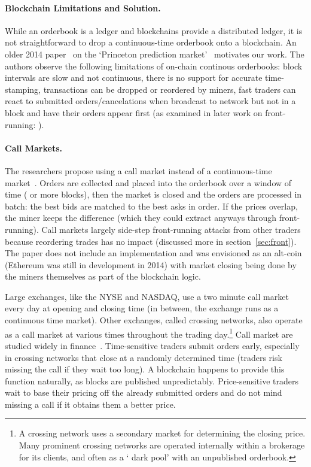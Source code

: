 \paragraph{Blockchain Limitations and Solution.} While an orderbook is a ledger and blockchains provide a distributed ledger, it is not straightforward to drop a continuous-time orderbook onto a blockchain. An older 2014 paper~\cite{clark2014decentralizing} on the `Princeton prediction market'~\cite{Bra13} motivates our work. The authors observe the following limitations of on-chain continous orderbooks: block intervals are slow and not continuous, there is no support for accurate time-stamping, transactions can be dropped or reordered by miners, fast traders can react to submitted orders/cancelations when broadcast to network but not in a block and have their orders appear first (as examined in later work on front-running: \cite{eskandari2019sok,daian2019flash}).

\paragraph{Call Markets.} The researchers propose using a call market instead of a continuous-time market~\cite{clark2014decentralizing}. Orders are collected and placed into the orderbook over a window of time ( or more blocks), then the market is closed and the orders are processed in batch: the best bids are matched to the best asks in order. If the prices overlap, the miner keeps the difference (which they could extract anyways through front-running). Call markets largely side-step front-running attacks from other traders because reordering trades has no impact (discussed more in section~\ref{sec:front}). The paper does not include an implementation and was envisioned as an alt-coin (Ethereum was still in development in 2014) with market closing being done by the miners themselves as part of the blockchain logic.

Large exchanges, like the NYSE and NASDAQ, use a two minute call market every day at opening and closing time (in between, the exchange runs as a continuous time market). Other exchanges, called crossing networks, also operate as a call market at various times throughout the trading day.\footnote{A crossing network uses a secondary market for determining the closing price. Many prominent crossing networks are operated internally within a brokerage for its clients, and often as a `	dark pool' with an unpublished orderbook.} Call market are studied widely in finance~\cite{Har03}. Time-sensitive traders submit orders early, especially in crossing networks that close at a randomly determined time (traders risk missing the call if they wait too long). A blockchain happens to provide this function naturally, as blocks are published unpredictably. Price-sensitive traders wait to base their pricing off the already submitted orders and do not mind missing a call if it obtains them a better price. 

